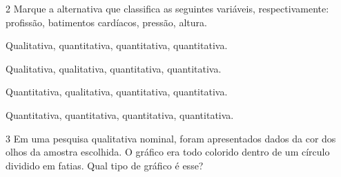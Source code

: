 




\num{2} Marque a alternativa que classifica as seguintes variáveis,
respectivamente: profissão, batimentos cardíacos, pressão, altura.

\begin{escolha}
\item Qualitativa, quantitativa, quantitativa, quantitativa.
\item Qualitativa, qualitativa, quantitativa, quantitativa.
\item Quantitativa, qualitativa, quantitativa, quantitativa.
\item Quantitativa, quantitativa, quantitativa, quantitativa.
\end{escolha}







\num{3} Em uma pesquisa qualitativa nominal, foram apresentados dados da cor
dos olhos da amostra escolhida. O gráfico era todo colorido dentro de um
círculo dividido em fatias. Qual tipo de gráfico é esse?

